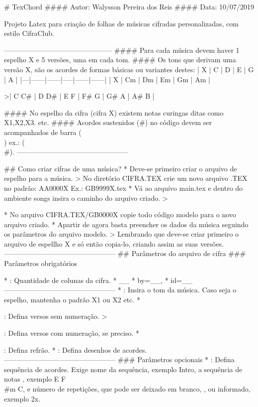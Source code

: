# TexChord 
#### Autor: Walysson Pereira dos Reis
#### Data: 10/07/2019

Projeto Latex para criação de folhas de músicas cifradas personalizadas, com estilo CifraClub.

-----------------------------------------------
#### Para cada música devem haver 1 espelho X e 5 versões, uma em cada tom.
#### Os tons que derivam uma versão X, são os acordes de formas básicas ou variantes destes: 
| X |   C  |  D   |  E 	|   G  |   A  |
|---|------|------|-----|------|------|
| X |  Cm  |  Dm  |  Em |   Gm |   Am |


>| C C# | D D# | E F | F# G | G# A | A# B |

#### No espelho da cifra (cifra X) existem notas curingas ditas como X1,X2,X3. etc.
#### Acordes sustenidos (#) no código devem ser acompanhados de barra (\\) ex.: (\\#).
------------------------------------------------

## Como criar cifras de  uma música?
* Deve-se primeiro criar o arquivo de espelho para a música.
> No diretório CIFRA.TEX crie um novo arquivo .TEX no padrão: AA0000X Ex.: GB9999X.tex
* Vá ao arquivo main.tex e dentro do ambiente songs insira o caminho do arquivo criado.
>\begin{songs}{}

\end{songs}
* No arquivo CIFRA.TEX/GB0000X copie todo código modelo para o novo arquivo criado.
* Apartir de agora basta preencher os dados da música seguindo os parâmetros do arquivo modelo.
> Lembrando que deve-se criar primeiro o arquivo de espellho X e só então copia-lo, criando assim as suas versões.
------------------------------------------------
## Parâmetros do arquivo de cifra
### Parâmetros obrigatórios

*  : Quantidade de colunas da cifra.
* {__} %
* by={__}, %
* id={__} %
------------------------------------------------
* \tom{_} : Insira o tom da música. Caso seja o espelho, mantenha o padrão X1 ou X2 etc.
* \begin{verse*} \end{verse*} : Defina versos sem numeração.
> \begin{verse} \end{verse} : Defina versos com numeração, se preciso.
* \begin{chorus} \end{chorus} : Defina refrão.
*  : Defina desenhos de acordes. 
------------------------------------------------
### Parâmetros opcionais
*  : Defina sequência de acordes. Exige nome da sequência, exemplo Intro, a sequência de notas
, exemplo E F\\#m C, e número de repetições, que pode ser deixado em branco, {}, ou informado, exemplo {2x}.

